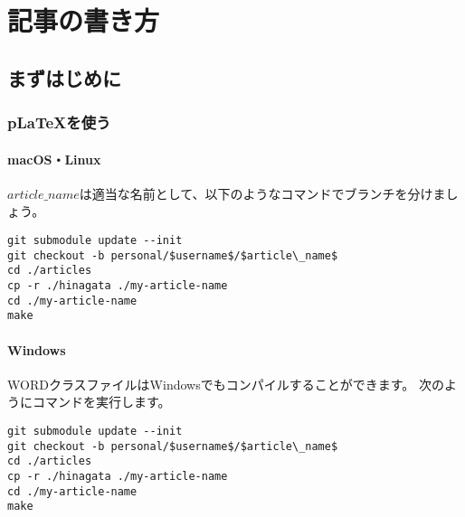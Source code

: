 
\usepackage{listings}
\lstset{
  basicstyle=\ttfamily,
  commentstyle=\textit,
  frame=trBL,
  numbers=left,
  breaklines=true,
  title=\lstname,
}
\usepackage{fancybox}
\usepackage{url}
\usepackage{hyperref}
\ifluatex
\else
  \usepackage{pxjahyper}
\fi

\subtitle{ヘッダの見出し}


\author{ほげ}



\chapter{記事の書き方}

\section{まずはじめに}

\subsection{p\LaTeX を使う}

\subsubsection{macOS・Linux}

$article\_name$は適当な名前として、以下のようなコマンドでブランチを分けましょう。

\begin{lstlisting}[mathescape]
git submodule update --init
git checkout -b personal/$username$/$article\_name$
cd ./articles
cp -r ./hinagata ./my-article-name
cd ./my-article-name
make
\end{lstlisting}

\subsubsection{Windows}

WORDクラスファイルはWindowsでもコンパイルすることができます。
次のようにコマンドを実行します。

\begin{lstlisting}[mathescape]
git submodule update --init
git checkout -b personal/$username$/$article\_name$
cd ./articles
cp -r ./hinagata ./my-article-name
cd ./my-article-name
make
\end{lstlisting}

